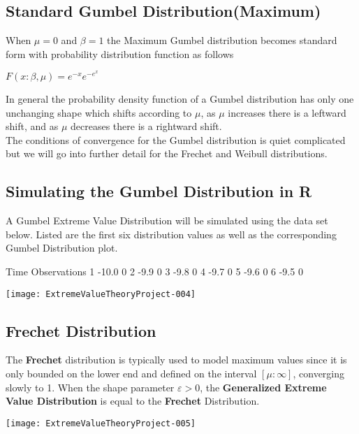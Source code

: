 \documentclass[11pt,a4paper]{article}
\theoremstyle{plain}
\begin{document}
\subsection*{Standard Gumbel Distribution(Maximum)}
When $\mu=0$ and $\beta=1$ the Maximum Gumbel distribution becomes standard form with probability distribution function as follows
\begin{center}
$F(x:\beta,\mu)=e^{-x}e^{-e^{x}}$
\end{center}

In general the probability density function of a Gumbel distribution has only one unchanging shape which shifts according to $\mu$, as $\mu$ increases there is a leftward shift, and as $\mu$ decreases there is a rightward shift.\\

The conditions of convergence for the Gumbel distribution is quiet complicated but we will go into further detail for the Frechet and Weibull distributions. 

\subsection*{Simulating the Gumbel Distribution in R} 
A Gumbel Extreme Value Distribution will be simulated using the data set below. Listed are the first six distribution values as well as the corresponding Gumbel Distribution plot.
\begin{Schunk}
\begin{Soutput}
   Time Observations
1 -10.0            0
2  -9.9            0
3  -9.8            0
4  -9.7            0
5  -9.6            0
6  -9.5            0
\end{Soutput}
\end{Schunk}

\texttt{[image: ExtremeValueTheoryProject-004]}



\subsection*{Frechet Distribution}
The \textbf{Frechet} distribution is typically used to model maximum values since it is only bounded on the lower end and defined on the interval $[\mu:\infty]$, converging slowly to 1. When the shape parameter $\varepsilon>0$, the \textbf{Generalized Extreme Value Distribution} is equal to the \textbf{Frechet} Distribution.

\texttt{[image: ExtremeValueTheoryProject-005]}
\end{document}
